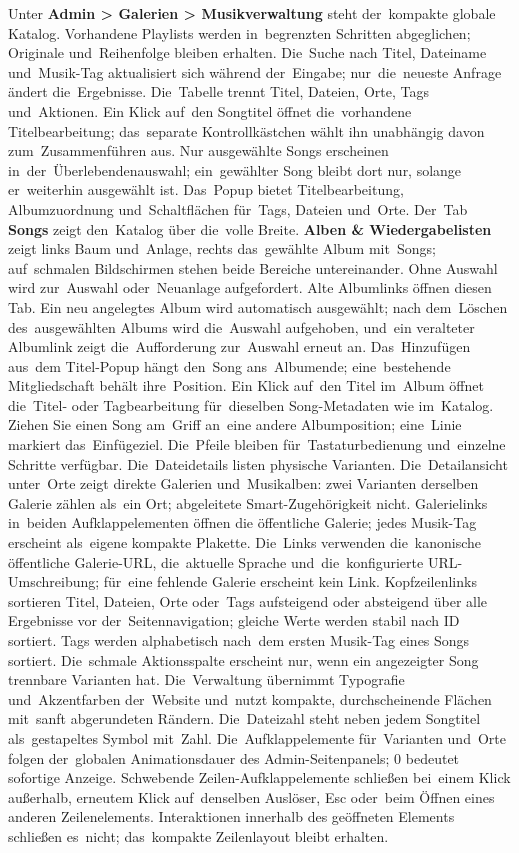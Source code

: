 \documentclass[11pt,a4paper]{article}
\newcommand{\ui}[1]{\textbf{#1}}
\begin{document}
Unter \ui{Admin > Galerien > Musikverwaltung} steht der~kompakte globale
Katalog. Vorhandene Playlists werden in~begrenzten Schritten abgeglichen;
Originale und~Reihenfolge bleiben erhalten. Die~Suche nach Titel, Dateiname
und~Musik-Tag aktualisiert sich während der~Eingabe; nur~die~neueste Anfrage
ändert die~Ergebnisse. Die~Tabelle trennt Titel, Dateien, Orte, Tags
und~Aktionen.
Ein Klick auf~den Songtitel öffnet die~vorhandene Titelbearbeitung; das~separate
Kontrollkästchen wählt ihn unabhängig davon zum~Zusammenführen aus. Nur
ausgewählte
Songs erscheinen in~der~Überlebendenauswahl; ein~gewählter Song bleibt dort nur,
solange er~weiterhin ausgewählt ist. Das~Popup
bietet Titelbearbeitung, Albumzuordnung und~Schaltflächen für~Tags, Dateien
und~Orte.
Der~Tab \ui{Songs} zeigt den~Katalog über die~volle Breite. \ui{Alben \&
Wiedergabelisten} zeigt links Baum und~Anlage, rechts das~gewählte Album
mit~Songs;
auf~schmalen Bildschirmen stehen beide Bereiche untereinander. Ohne Auswahl wird
zur~Auswahl oder~Neuanlage aufgefordert. Alte Albumlinks öffnen diesen Tab.
Ein neu angelegtes Album wird automatisch ausgewählt; nach dem~Löschen
des~ausgewählten
Albums wird die~Auswahl aufgehoben, und~ein veralteter Albumlink zeigt
die~Aufforderung
zur~Auswahl erneut an.
Das~Hinzufügen aus~dem Titel-Popup hängt den~Song ans~Albumende; eine~bestehende
Mitgliedschaft behält ihre~Position. Ein Klick auf~den Titel im~Album öffnet
die~Titel- oder Tagbearbeitung für~dieselben Song-Metadaten wie im~Katalog.
Ziehen Sie einen Song am~Griff an~eine andere Albumposition; eine~Linie markiert
das~Einfügeziel. Die~Pfeile bleiben
für~Tastaturbedienung und~einzelne Schritte verfügbar.
Die~Dateidetails listen physische Varianten. Die~Detailansicht unter~Orte zeigt
direkte Galerien und~Musikalben: zwei Varianten derselben Galerie zählen
als~ein Ort; abgeleitete Smart-Zugehörigkeit nicht. Galerielinks in~beiden
Aufklappelementen öffnen die
öffentliche Galerie; jedes Musik-Tag erscheint als~eigene kompakte
Plakette.
Die~Links verwenden die~kanonische öffentliche Galerie-URL, die~aktuelle Sprache
und~die~konfigurierte URL-Umschreibung; für~eine fehlende Galerie erscheint kein
Link.
Kopfzeilenlinks sortieren Titel, Dateien, Orte oder~Tags aufsteigend oder
absteigend über alle Ergebnisse vor der~Seitennavigation; gleiche Werte werden
stabil nach ID sortiert. Tags werden alphabetisch nach~dem ersten Musik-Tag
eines Songs sortiert.
Die~schmale Aktionsspalte erscheint nur, wenn ein angezeigter Song trennbare
Varianten hat.
Die~Verwaltung übernimmt Typografie und~Akzentfarben der~Website und~nutzt
kompakte, durchscheinende Flächen mit~sanft abgerundeten Rändern. Die~Dateizahl
steht neben jedem Songtitel als~gestapeltes Symbol mit~Zahl.
Die~Aufklappelemente
für~Varianten und~Orte folgen der~globalen Animationsdauer des
Admin-Seitenpanels;
0 bedeutet sofortige Anzeige.
Schwebende Zeilen-Aufklappelemente schließen bei~einem Klick außerhalb, erneutem
Klick auf~denselben Auslöser, Esc oder~beim Öffnen eines anderen Zeilenelements.
Interaktionen innerhalb des geöffneten Elements schließen es~nicht; das~kompakte
Zeilenlayout bleibt erhalten.
\end{document}

